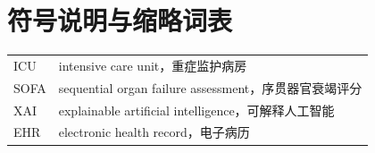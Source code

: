 \chapter*{符号说明与缩略词表}

\begin{longtable}{@{}p{}p{}@{}}
  ICU & intensive care unit，重症监护病房 \\
  SOFA & sequential organ failure assessment，序贯器官衰竭评分 \\
  XAI & explainable artificial intelligence，可解释人工智能 \\
  EHR & electronic health record，电子病历 \\
\end{longtable}
